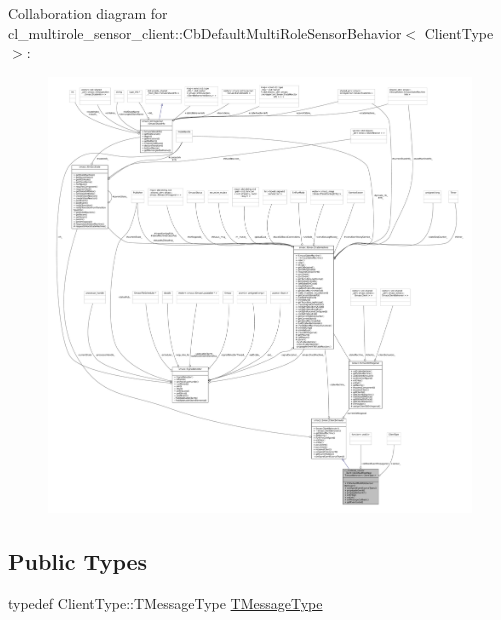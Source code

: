 Collaboration diagram for cl\+\_\+multirole\+\_\+sensor\+\_\+client\+:\+:Cb\+Default\+Multi\+Role\+Sensor\+Behavior$<$ Client\+Type $>$\+:
\nopagebreak
\begin{figure}[H]
\begin{center}
\leavevmode
\includegraphics[width=350pt]{classcl__multirole__sensor__client_1_1CbDefaultMultiRoleSensorBehavior__coll__graph}
\end{center}
\end{figure}
\subsection*{Public Types}
\begin{DoxyCompactItemize}
\item 
typedef Client\+Type\+::\+T\+Message\+Type \hyperlink{classcl__multirole__sensor__client_1_1CbDefaultMultiRoleSensorBehavior_a4217b1d33467f30625d7735e5612efc0}{T\+Message\+Type}
\end{DoxyCompactItemize}
